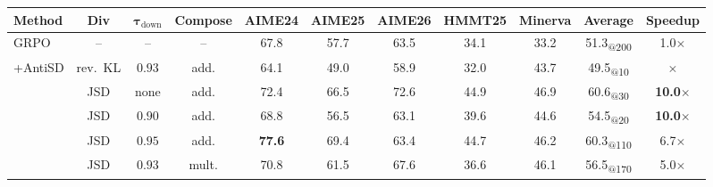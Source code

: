 \documentclass{llmxive}
\providecommand{\arraystretch}{0.95}
\begin{document}
\begin{table}[ht]
  \vspace{-0.5em}
  \label{tab:ablation}
  \centering
  \small
  \setlength{\tabcolsep}{1.5pt}
  \renewcommand{\arraystretch}{0.95}
  \begin{tabular}{l|ccc|cccccc|c}
    \toprule
    \textbf{Method}          & \textbf{Div} & $\boldsymbol{\tau_{\mathrm{down}}}$ & \textbf{Compose}             & \textbf{AIME24} & \textbf{AIME25} & \textbf{AIME26} & \textbf{HMMT25} & \textbf{Minerva} & \textbf{Average}                                & \textbf{Speedup}      \\
    \midrule
    GRPO                     & --           & --                                  & --                           & 67.8            & 57.7            & 63.5            & 34.1            & 33.2             & 51.3\textsubscript{@200}                        & 1.0$\times$           \\
    \midrule
    \multirow{7}{*}{+AntiSD} & rev.~KL      & $0.93$                              & add.                         & 64.1            & 49.0            & 58.9            & 32.0            & 43.7             & 49.5\textsubscript{@10}                         & $\times$              \\
    \cmidrule{2-11}
                             & JSD          & none                                & add.                         & 72.4            & 66.5            & 72.6            & 44.9            & 46.9             & 60.6\textsubscript{@30}                         & \textbf{10.0$\times$} \\
                             & JSD          & $0.90$                              & add.                         & 68.8            & 56.5            & 63.1            & 39.6            & 44.6             & 54.5\textsubscript{@20}                         & \textbf{10.0$\times$} \\
                             & JSD          & $0.95$                              & add.                         & \textbf{77.6}   & 69.4            & 63.4            & 44.7            & 46.2             & 60.3\textsubscript{@110}                        & 6.7$\times$           \\
    \cmidrule{2-11}
                             & JSD          & $0.93$                              & mult.                        & 70.8            & 61.5            & 67.6            & 36.6            & 46.1             & 56.5\textsubscript{@170}                        & 5.0$\times$           \\

\end{tabular}
\end{table}
\end{document}
